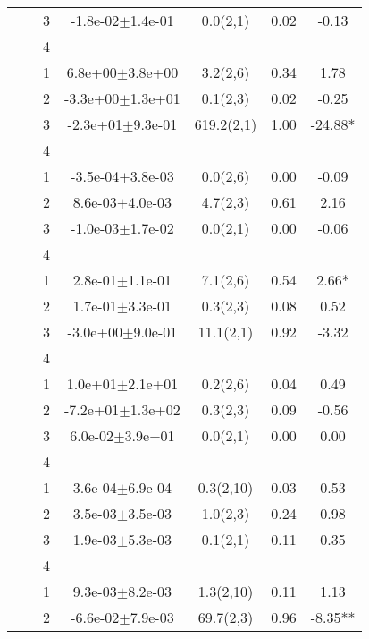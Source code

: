 \begin{longtable}[H]{llccccS[table-format=-2.2, table-space-text-post = {***}]}
   &  & 3 & -1.8e-02$\pm$1.4e-01 & 0.0(2,1) & 0.02 & -0.13 \\* 
   &  & 4 &  &  &  &  \\ 
   \midrule
{} & {} & 1 &  6.8e+00$\pm$3.8e+00 & 3.2(2,6) & 0.34 & 1.78 \\* 
   &  & 2 & -3.3e+00$\pm$1.3e+01 & 0.1(2,3) & 0.02 & -0.25 \\* 
   &  & 3 & -2.3e+01$\pm$9.3e-01 & 619.2(2,1) & 1.00 & -24.88* \\* 
   &  & 4 &  &  &  &  \\ 
   \midrule
{} & {} & 1 & -3.5e-04$\pm$3.8e-03 & 0.0(2,6) & 0.00 & -0.09 \\* 
   &  & 2 &  8.6e-03$\pm$4.0e-03 & 4.7(2,3) & 0.61 & 2.16 \\* 
   &  & 3 & -1.0e-03$\pm$1.7e-02 & 0.0(2,1) & 0.00 & -0.06 \\* 
   &  & 4 &  &  &  &  \\
   \midrule
{} & {} & 1 &  2.8e-01$\pm$1.1e-01 & 7.1(2,6) & 0.54 & 2.66* \\* 
   &  & 2 &  1.7e-01$\pm$3.3e-01 & 0.3(2,3) & 0.08 & 0.52 \\* 
   &  & 3 & -3.0e+00$\pm$9.0e-01 & 11.1(2,1) & 0.92 & -3.32 \\* 
   &  & 4 &  &  &  &  \\
   \midrule
{} & {} & 1 &  1.0e+01$\pm$2.1e+01 & 0.2(2,6) & 0.04 & 0.49 \\* 
   &  & 2 & -7.2e+01$\pm$1.3e+02 & 0.3(2,3) & 0.09 & -0.56 \\* 
   &  & 3 &  6.0e-02$\pm$3.9e+01 & 0.0(2,1) & 0.00 & 0.00 \\* 
   &  & 4 &  &  &  &  \\
   \midrule
{} & {} & 1 &  3.6e-04$\pm$6.9e-04 & 0.3(2,10) & 0.03 & 0.53 \\* 
   &  & 2 &  3.5e-03$\pm$3.5e-03 & 1.0(2,3) & 0.24 & 0.98 \\* 
   &  & 3 &  1.9e-03$\pm$5.3e-03 & 0.1(2,1) & 0.11 & 0.35 \\* 
   &  & 4 &  &  &  &  \\
   \midrule
{} & {} & 1 &  9.3e-03$\pm$8.2e-03 & 1.3(2,10) & 0.11 & 1.13 \\* 
   &  & 2 & -6.6e-02$\pm$7.9e-03 & 69.7(2,3) & 0.96 & -8.35** \\* 

\end{longtable}
